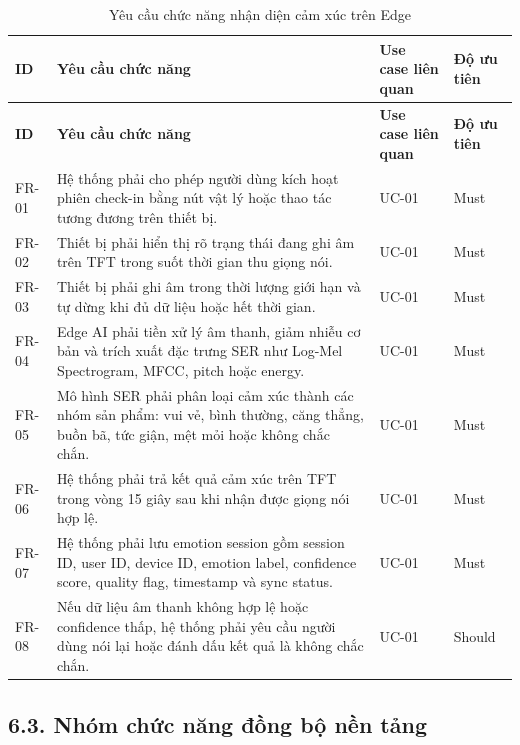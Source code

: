 \documentclass[12pt,a4paper]{article}
\begin{document}
\begin{center}
\scriptsize
\begin{longtable}{|P{0.12\textwidth}|P{0.44\textwidth}|P{0.24\textwidth}|P{0.12\textwidth}|}
\caption{Yêu cầu chức năng nhận diện cảm xúc trên Edge}\\
\hline
\textbf{ID} & \textbf{Yêu cầu chức năng} & \textbf{Use case liên quan} & \textbf{Độ ưu tiên} \\
\hline
\endfirsthead
\hline
\textbf{ID} & \textbf{Yêu cầu chức năng} & \textbf{Use case liên quan} & \textbf{Độ ưu tiên} \\
\hline
\endhead
FR-01 & Hệ thống phải cho phép người dùng kích hoạt phiên check-in bằng nút vật lý hoặc thao tác tương đương trên thiết bị. & UC-01 & Must \\
\hline
FR-02 & Thiết bị phải hiển thị rõ trạng thái đang ghi âm trên TFT trong suốt thời gian thu giọng nói. & UC-01 & Must \\
\hline
FR-03 & Thiết bị phải ghi âm trong thời lượng giới hạn và tự dừng khi đủ dữ liệu hoặc hết thời gian. & UC-01 & Must \\
\hline
FR-04 & Edge AI phải tiền xử lý âm thanh, giảm nhiễu cơ bản và trích xuất đặc trưng SER như Log-Mel Spectrogram, MFCC, pitch hoặc energy. & UC-01 & Must \\
\hline
FR-05 & Mô hình SER phải phân loại cảm xúc thành các nhóm sản phẩm: vui vẻ, bình thường, căng thẳng, buồn bã, tức giận, mệt mỏi hoặc không chắc chắn. & UC-01 & Must \\
\hline
FR-06 & Hệ thống phải trả kết quả cảm xúc trên TFT trong vòng 15 giây sau khi nhận được giọng nói hợp lệ. & UC-01 & Must \\
\hline
FR-07 & Hệ thống phải lưu emotion session gồm session ID, user ID, device ID, emotion label, confidence score, quality flag, timestamp và sync status. & UC-01 & Must \\
\hline
FR-08 & Nếu dữ liệu âm thanh không hợp lệ hoặc confidence thấp, hệ thống phải yêu cầu người dùng nói lại hoặc đánh dấu kết quả là không chắc chắn. & UC-01 & Should \\
\hline
\end{longtable}
\normalsize
\end{center}

\subsection*{6.3. Nhóm chức năng đồng bộ nền tảng}
\end{document}
